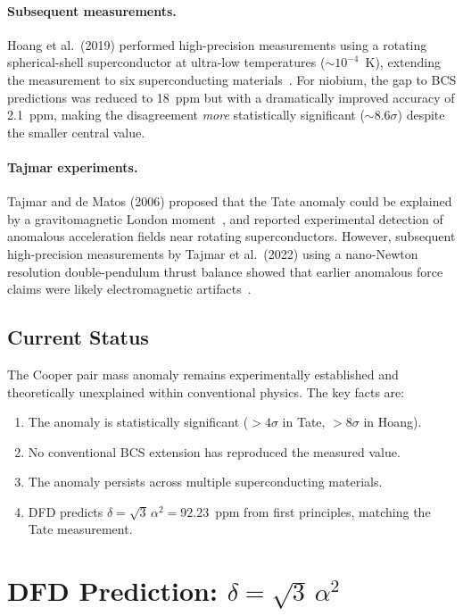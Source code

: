 \documentclass[12pt,a4paper]{article}
\theoremstyle{definition}
\theoremstyle{remark}
\begin{document}
\paragraph{Subsequent measurements.}
Hoang et al.\ (2019) performed high-precision measurements using a rotating
spherical-shell superconductor at ultra-low temperatures ($\sim 10^{-4}$~K),
extending the measurement to six superconducting materials~\cite{Hoang2019}.
For niobium, the gap to BCS predictions was reduced to 18~ppm but with a
dramatically improved accuracy of 2.1~ppm, making the disagreement \emph{more}
statistically significant ($\sim 8.6\sigma$) despite the smaller central value.

\paragraph{Tajmar experiments.}
Tajmar and de Matos (2006) proposed that the Tate anomaly could be explained by
a gravitomagnetic London moment~\cite{Tajmar2006}, and reported experimental
detection of anomalous acceleration fields near rotating superconductors.
However, subsequent high-precision measurements by Tajmar et al.\ (2022) using
a nano-Newton resolution double-pendulum thrust balance showed that earlier
anomalous force claims were likely electromagnetic artifacts~\cite{Tajmar2022}.

\subsection{Current Status}

The Cooper pair mass anomaly remains experimentally established and theoretically
unexplained within conventional physics.  The key facts are:
\begin{enumerate}[label=(\roman*)]
\item The anomaly is statistically significant ($> 4\sigma$ in Tate, $> 8\sigma$
in Hoang).
\item No conventional BCS extension has reproduced the measured value.
\item The anomaly persists across multiple superconducting materials.
\item DFD predicts $\delta = \sqrt{3}\,\alpha^2 = 92.23$~ppm from first
principles, matching the Tate measurement.
\end{enumerate}

\section{DFD Prediction: $\delta = \sqrt{3}\,\alpha^2$}\label{sec:dfd}
\end{document}
